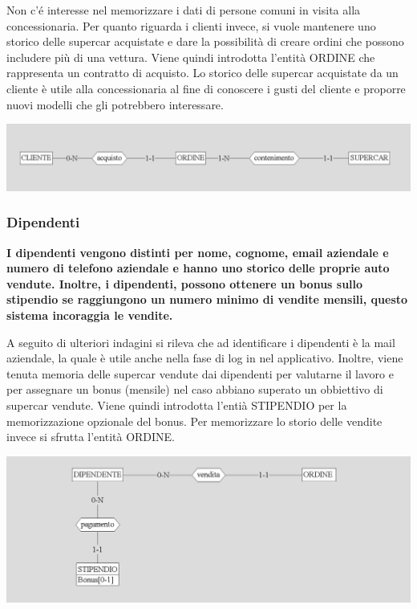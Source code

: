 \documentclass[12pt]{article}
\begin{document}
Non c'é interesse nel memorizzare i dati di persone comuni in visita alla
concessionaria. Per quanto riguarda i clienti invece, si vuole mantenere uno
storico delle supercar acquistate e dare la possibilità di creare ordini che
possono includere più di una vettura. Viene quindi introdotta l'entità ORDINE
che rappresenta un contratto di acquisto. Lo storico delle supercar acquistate
da un cliente è utile alla concessionaria al fine di conoscere i gusti del
cliente e proporre nuovi modelli che gli potrebbero interessare.

\begin{center}
    \includegraphics[width=\linewidth]{images/ordine.png}
\end{center}

\subsubsection{Dipendenti}
\textbf{I dipendenti vengono distinti per nome, cognome, email aziendale e
numero di telefono aziendale e hanno uno storico delle proprie auto vendute.
Inoltre, i dipendenti, possono ottenere un bonus sullo stipendio se raggiungono
un numero minimo di vendite mensili, questo sistema incoraggia le vendite.}

A seguito di ulteriori indagini si rileva che ad identificare i dipendenti è la
mail aziendale, la quale è utile anche nella fase di log in nel applicativo.
Inoltre, viene tenuta memoria delle supercar vendute dai dipendenti per
valutarne il lavoro e per assegnare un bonus (mensile) nel caso abbiano superato
un obbiettivo di supercar vendute. Viene quindi introdotta l'entià STIPENDIO per
la memorizzazione opzionale del bonus. Per memorizzare lo storio delle vendite
invece si sfrutta l'entità ORDINE.

\begin{center}
    \includegraphics[width=\linewidth]{images/dipendente.png}
\end{center}
\end{document}
